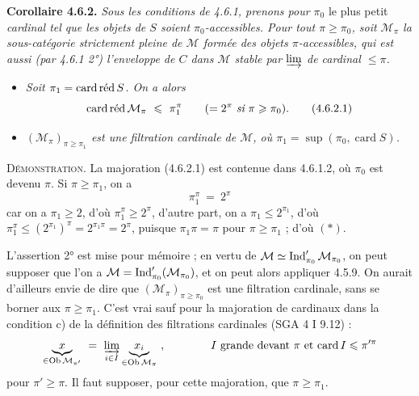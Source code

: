 \textbf{Corollaire 4.6.2.} \textit{Sous les conditions de 4.6.1, prenons pour $\pi_0$} le plus petit \textit{cardinal tel que les objets de $S$ soient $\pi_0$-accessibles. Pour tout $\pi\geqslant\pi_0$, soit $\mathcal{M}_\pi$ la sous-catégorie strictement pleine de $\mathcal{M}$ formée des objets $\pi$-accessibles, qui est aussi (par 4.6.1 2°) l'enveloppe de $C$ dans $\mathcal{M}$ stable par $\varinjlim$ de cardinal $\leqslant\pi$.}
\begin{itemize}[leftmargin=2.5em]
\item[\textit{1°)}] \textit{Soit $\pi_1=\cardred S$. On a alors}
\[
\cardred\mathcal{M}_\pi \ \leqslant\ \pi_1^{\pi} \qquad (=2^{\pi}\ \textit{si}\ \pi\geqslant\pi_0). \tag*{(4.6.2.1)}
\]
\item[\textit{2°)}] \textit{$(\mathcal{M}_\pi)_{\pi\geqslant\pi_1}$ est une filtration cardinale de $\mathcal{M}$, où $\pi_1=\sup(\pi_0,\operatorname{card}S)$.}
\end{itemize}

\textsc{Démonstration}. La majoration (4.6.2.1) est contenue dans 4.6.1.2, où $\pi_0$ est devenu $\pi$. Si $\pi\geqslant\pi_1$, on a
\[
\pi_1^{\pi} \ =\ 2^{\pi} \tag*{$(*)$}
\]
car on a $\pi_1\geqslant2$, d'où $\pi_1^{\pi}\geqslant2^{\pi}$, d'autre part, on a $\pi_1\leqslant2^{\pi_1}$, d'où $\pi_1^{\pi}\leqslant(2^{\pi_1})^{\pi}=2^{\pi_1\pi}=2^{\pi}$, puisque $\pi_1\pi=\pi$ pour $\pi\geqslant\pi_1$ ; d'où $(*)$.

L'assertion 2° est mise pour mémoire ; en vertu de $\mathcal{M}\simeq\Ind'_{\pi_0}\mathcal{M}_{\pi_0}$, on peut supposer que l'on a $\mathcal{M}=\Ind'_{\pi_0}(\mathcal{M}_{\pi_0})$, et on peut alors appliquer 4.5.9. On aurait d'ailleurs envie de dire que $(\mathcal{M}_\pi)_{\pi\geqslant\pi_0}$ est une filtration cardinale, sans se borner aux $\pi\geqslant\pi_1$. C'est vrai sauf pour la majoration de cardinaux dans la condition c) de la définition des filtrations cardinales (SGA 4 I 9.12) :
\[
\underbrace{x}_{\in\operatorname{Ob}\mathcal{M}_{\pi'}} \ =\ \varinjlim_{i\in I}\underbrace{x_i}_{\in\operatorname{Ob}\mathcal{M}_{\pi}}\ , \qquad\qquad \text{$I$ grande devant $\pi$ et $\operatorname{card}I\leqslant\pi'^{\pi}$}
\]
pour $\pi'\geqslant\pi$. Il faut supposer, pour cette majoration, que $\pi\geqslant\pi_1$.


